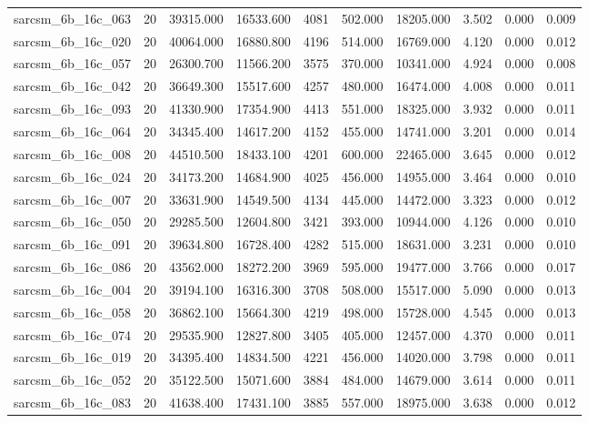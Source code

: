 \begin{tabular}{lrrrrrrrrr}
sarcsm\_6b\_16c\_063 & 20 & 39315.000 & 16533.600 & 4081 & 502.000 & 18205.000 & 3.502 & 0.000 & 0.009 \\
sarcsm\_6b\_16c\_020 & 20 & 40064.000 & 16880.800 & 4196 & 514.000 & 16769.000 & 4.120 & 0.000 & 0.012 \\
sarcsm\_6b\_16c\_057 & 20 & 26300.700 & 11566.200 & 3575 & 370.000 & 10341.000 & 4.924 & 0.000 & 0.008 \\
sarcsm\_6b\_16c\_042 & 20 & 36649.300 & 15517.600 & 4257 & 480.000 & 16474.000 & 4.008 & 0.000 & 0.011 \\
sarcsm\_6b\_16c\_093 & 20 & 41330.900 & 17354.900 & 4413 & 551.000 & 18325.000 & 3.932 & 0.000 & 0.011 \\
sarcsm\_6b\_16c\_064 & 20 & 34345.400 & 14617.200 & 4152 & 455.000 & 14741.000 & 3.201 & 0.000 & 0.014 \\
sarcsm\_6b\_16c\_008 & 20 & 44510.500 & 18433.100 & 4201 & 600.000 & 22465.000 & 3.645 & 0.000 & 0.012 \\
sarcsm\_6b\_16c\_024 & 20 & 34173.200 & 14684.900 & 4025 & 456.000 & 14955.000 & 3.464 & 0.000 & 0.010 \\
sarcsm\_6b\_16c\_007 & 20 & 33631.900 & 14549.500 & 4134 & 445.000 & 14472.000 & 3.323 & 0.000 & 0.012 \\
sarcsm\_6b\_16c\_050 & 20 & 29285.500 & 12604.800 & 3421 & 393.000 & 10944.000 & 4.126 & 0.000 & 0.010 \\
sarcsm\_6b\_16c\_091 & 20 & 39634.800 & 16728.400 & 4282 & 515.000 & 18631.000 & 3.231 & 0.000 & 0.010 \\
sarcsm\_6b\_16c\_086 & 20 & 43562.000 & 18272.200 & 3969 & 595.000 & 19477.000 & 3.766 & 0.000 & 0.017 \\
sarcsm\_6b\_16c\_004 & 20 & 39194.100 & 16316.300 & 3708 & 508.000 & 15517.000 & 5.090 & 0.000 & 0.013 \\
sarcsm\_6b\_16c\_058 & 20 & 36862.100 & 15664.300 & 4219 & 498.000 & 15728.000 & 4.545 & 0.000 & 0.013 \\
sarcsm\_6b\_16c\_074 & 20 & 29535.900 & 12827.800 & 3405 & 405.000 & 12457.000 & 4.370 & 0.000 & 0.011 \\
sarcsm\_6b\_16c\_019 & 20 & 34395.400 & 14834.500 & 4221 & 456.000 & 14020.000 & 3.798 & 0.000 & 0.011 \\
sarcsm\_6b\_16c\_052 & 20 & 35122.500 & 15071.600 & 3884 & 484.000 & 14679.000 & 3.614 & 0.000 & 0.011 \\
sarcsm\_6b\_16c\_083 & 20 & 41638.400 & 17431.100 & 3885 & 557.000 & 18975.000 & 3.638 & 0.000 & 0.012 \\

\end{tabular}
